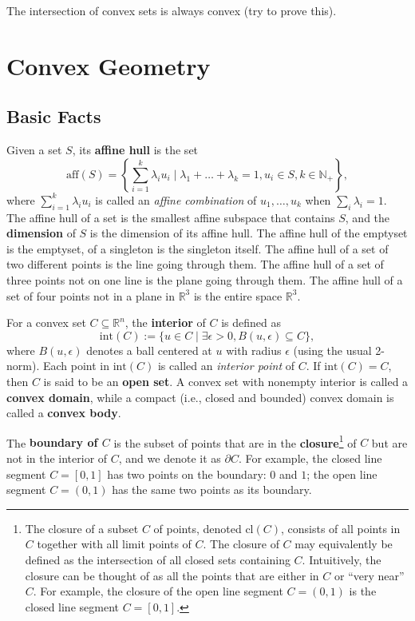\documentclass[
]{book}
\theoremstyle{definition}
\theoremstyle{definition}
\theoremstyle{definition}
\theoremstyle{definition}
\theoremstyle{remark}
\begin{document}
The intersection of convex sets is always convex (try to prove this).

\hypertarget{background:convex:geometry}{%
\section{Convex Geometry}\label{background:convex:geometry}}

\hypertarget{basic-facts}{%
\subsection{Basic Facts}\label{basic-facts}}

Given a set \(S\), its \textbf{affine hull} is the set
\[
\mathrm{aff}(S) =  \left\{  \sum_{i=1}^k \lambda_i u_i \mid \lambda_1 + \dots + \lambda_k = 1, u_i \in S, k \in \mathbb{N}_{+}  \right\} ,
\]
where \(\sum_{i=1}^{k} \lambda_i u_i\) is called an \emph{affine combination} of \(u_1,\dots,u_k\) when \(\sum_i \lambda_i = 1\). The affine hull of a set is the smallest affine subspace that contains \(S\), and the \textbf{dimension} of \(S\) is the dimension of its affine hull. The affine hull of the emptyset is the emptyset, of a singleton is the singleton itself. The affine hull of a set of two different points is the line going through them. The affine hull of a set of three points not on one line is the plane going through them. The affine hull of a set of four points not in a plane in \(\mathbb{R}^{3}\) is the entire space \(\mathbb{R}^{3}\).

For a convex set \(C \subseteq \mathbb{R}^{n}\), the \textbf{interior} of \(C\) is defined as
\[
\mathrm{int}(C) := \{  u \in C \mid \exists \epsilon > 0, B(u,\epsilon) \subseteq C  \},
\]
where \(B(u,\epsilon)\) denotes a ball centered at \(u\) with radius \(\epsilon\) (using the usual 2-norm). Each point in \(\mathrm{int}(C)\) is called an \emph{interior point} of \(C\). If \(\mathrm{int}(C) = C\), then \(C\) is said to be an \textbf{open set}. A convex set with nonempty interior is called a \textbf{convex domain}, while a compact (i.e., closed and bounded) convex domain is called a \textbf{convex body}.

The \textbf{boundary of \(C\)} is the subset of points that are in the \textbf{closure}\footnote{The closure of a subset \(C\) of points, denoted \(\mathrm{cl}(C)\), consists of all points in \(C\) together with all limit points of \(C\). The closure of \(C\) may equivalently be defined as the intersection of all closed sets containing \(C\). Intuitively, the closure can be thought of as all the points that are either in \(C\) or ``very near'' \(C\). For example, the closure of the open line segment \(C= (0,1)\) is the closed line segment \(C=[0,1]\).} of \(C\) but are not in the interior of \(C\), and we denote it as \(\partial C\). For example, the closed line segment \(C = [0,1]\) has two points on the boundary: \(0\) and \(1\); the open line segment \(C = (0,1)\) has the same two points as its boundary.
\end{document}
